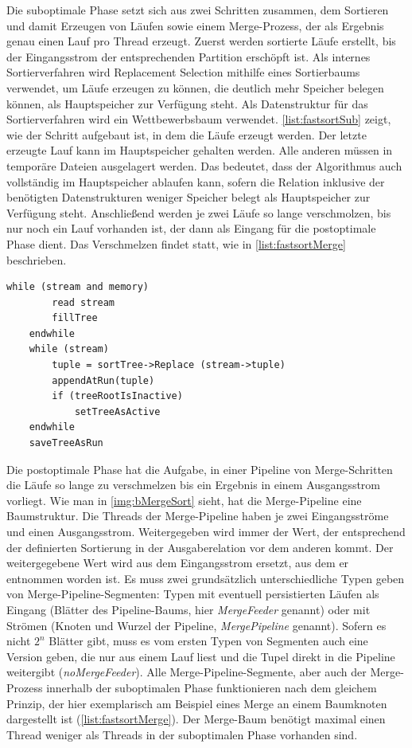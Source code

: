 \documentclass[a4paper,12pt,twoside]{article}
\newcommand{\Fb}[1]{\textit{#1}} %
\begin{document}
Die suboptimale Phase setzt sich aus zwei Schritten zusammen, dem Sortieren und damit Erzeugen von Läufen sowie einem Merge-Prozess, der als Ergebnis genau einen Lauf pro Thread erzeugt. Zuerst werden sortierte Läufe erstellt, bis der Eingangsstrom der entsprechenden Partition erschöpft ist. Als internes Sortierverfahren wird Replacement Selection mithilfe eines Sortierbaums verwendet, um Läufe erzeugen zu können, die deutlich mehr Speicher belegen können, als Hauptspeicher zur Verfügung steht. Als Datenstruktur für das Sortierverfahren wird ein Wettbewerbsbaum verwendet. \autoref{list:fastsortSub} zeigt, wie der Schritt aufgebaut ist, in dem die Läufe erzeugt werden. Der letzte erzeugte Lauf kann im Hauptspeicher gehalten werden. Alle anderen müssen in temporäre Dateien ausgelagert werden. Das bedeutet, dass der Algorithmus auch vollständig im Hauptspeicher ablaufen kann, sofern die Relation inklusive der benötigten Datenstrukturen weniger Speicher belegt als Hauptspeicher zur Verfügung steht. Anschließend werden je zwei Läufe so lange verschmolzen, bis nur noch ein Lauf vorhanden ist, der dann als Eingang für die postoptimale Phase dient. Das Verschmelzen findet statt, wie in  \autoref{list:fastsortMerge} beschrieben.

\begin{minipage}{\linewidth}
	\begin{lstlisting}[caption={Fastsort: Erzeugen der Runs in der Suboptimalen Phase}, label=list:fastsortSub] 
	while (stream and memory) 
		read stream
		fillTree
	endwhile
	while (stream)
		tuple = sortTree->Replace (stream->tuple)
		appendAtRun(tuple)
		if (treeRootIsInactive)
			setTreeAsActive
	endwhile
	saveTreeAsRun
	\end{lstlisting}
\end{minipage}

Die postoptimale Phase hat die Aufgabe, in einer Pipeline von Merge-Schritten die Läufe so lange zu verschmelzen bis ein Ergebnis in einem Ausgangsstrom vorliegt. Wie man in \autoref{img:bMergeSort} sieht, hat die Merge-Pipeline eine Baumstruktur. Die Threads der Merge-Pipeline haben je zwei Eingangsströme und einen Ausgangsstrom. Weitergegeben wird immer der Wert, der entsprechend der definierten Sortierung in der Ausgaberelation vor dem anderen kommt. Der weitergegebene Wert wird aus dem Eingangsstrom ersetzt, aus dem er entnommen worden ist. Es muss zwei grundsätzlich unterschiedliche Typen geben von Merge-Pipeline-Segmenten: Typen mit eventuell persistierten Läufen als Eingang (Blätter des Pipeline-Baums, hier \Fb{MergeFeeder} genannt) oder mit Strömen (Knoten und Wurzel der Pipeline, \Fb{MergePipeline} genannt). Sofern es nicht $2^n$ Blätter gibt, muss es vom ersten Typen von Segmenten auch eine Version geben, die nur aus einem Lauf liest und die Tupel direkt in die Pipeline weitergibt (\Fb{noMergeFeeder}). Alle Merge-Pipeline-Segmente, aber auch der Merge-Prozess innerhalb der suboptimalen Phase funktionieren nach dem gleichem Prinzip, der hier exemplarisch am Beispiel eines Merge an einem Baumknoten dargestellt ist (\autoref{list:fastsortMerge}). Der Merge-Baum benötigt maximal einen Thread weniger als Threads in der suboptimalen Phase vorhanden sind.
\end{document}
